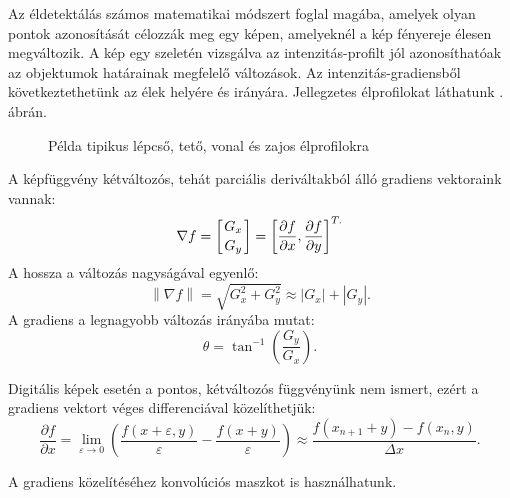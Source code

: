 
Az éldetektálás számos matematikai módszert foglal magába, amelyek olyan pontok azonosítását célozzák meg egy képen, amelyeknél a kép fényereje élesen megváltozik. A kép egy szeletén vizsgálva az intenzitás-profilt jól azonosíthatóak az objektumok határainak megfelelő változások. Az intenzitás-gradiensből következtethetünk az élek helyére és irányára. Jellegzetes élprofilokat láthatunk . ábrán.

\begin{figure}[ht]
\centering
{}
\caption{Példa tipikus lépcső, tető, vonal és zajos élprofilokra} 
\label{fig:elprofilok}
\end{figure}

A képfüggvény kétváltozós, tehát parciális deriváltakból álló gradiens vektoraink vannak: 
$$
\nabla f =
\left[ \genfrac{}{}{0pt}{}{G_x}{G_y} \right] =
\left[ \frac{\partial f}{\partial x}, \frac{\partial f}{\partial y}  \right]^{T.}$$
A hossza a változás nagyságával egyenlő: 
$$
\left\| \nabla f \right \| =
\sqrt{G_{x}^{2}+G_{y}^{2}} \approx
\left | G_x  \right |+\left | G_y  \right |.
$$
A gradiens a legnagyobb változás irányába mutat: 
$$
\theta = \tan^{-1}\left(\frac{G_y}{G_x}\right).
$$

Digitális képek esetén a pontos, kétváltozós függvényünk nem ismert, ezért a gradiens vektort véges differenciával közelíthetjük:
$$
\frac{\partial f}{\partial x} =
\lim_{\varepsilon \to 0} \left(
\frac{f(x+\varepsilon,y)}{\varepsilon}-\frac{f(x+y)}{\varepsilon}
\right) \approx
\frac{f(x_{n+1}+y)-f(x_n,y)}{\Delta x}.
$$

A gradiens közelítéséhez konvolúciós maszkot is használhatunk.




